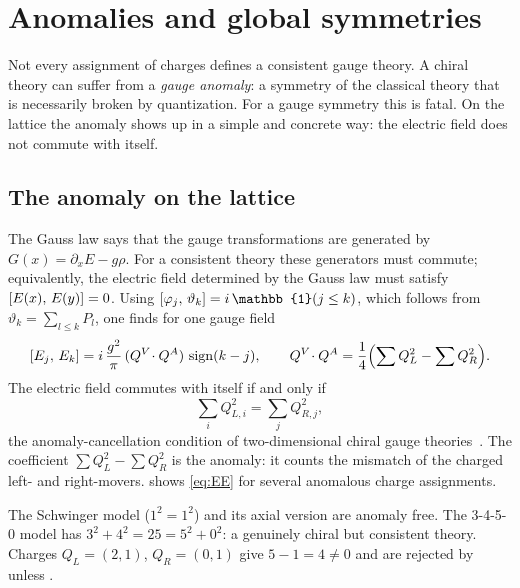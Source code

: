 \chapter{Anomalies and global symmetries}\label{chap:anomalies}

Not every assignment of charges defines a consistent gauge theory. A chiral theory can suffer from a
\emph{gauge anomaly}: a symmetry of the classical theory that is necessarily broken by quantization. For a gauge
symmetry this is fatal. On the lattice the anomaly shows up in a simple and concrete way: the electric field
does not commute with itself.

\section{The anomaly on the lattice}
The Gauss law says that the gauge transformations are generated by $G(x) = \partial_xE - g\rho$. For a consistent
theory these generators must commute; equivalently, the electric field determined by the Gauss law must satisfy
$[E(x),\,E(y)] = 0$. Using $\comm{\varphi_j}{\vartheta_k} = i\,\mathbb{1}(j\leq k)$, which follows from
$\vartheta_k = \sum_{l\leq k}P_l$, one finds for one gauge field
\begin{equation}\label{eq:EE}
  [E_j,\,E_k] = i\,\frac{g^2}{\pi}\,(Q^V\!\cdot Q^A)\,\operatorname{sign}(k-j),\qquad
  Q^V\!\cdot Q^A = \frac14\Bigl(\sum Q_L^2 - \sum Q_R^2\Bigr).
\end{equation}
The electric field commutes with itself if and only if
\begin{equation}\label{eq:anomaly-free}
  \sum_i Q_{L,i}^2 = \sum_j Q_{R,j}^2 ,
\end{equation}
the anomaly-cancellation condition of two-dimensional chiral gauge theories~\cite{Bertlmann1996}. The coefficient
$\sum Q_L^2 - \sum Q_R^2$ is the anomaly: it counts the mismatch of the charged left- and right-movers.
 shows \eqref{eq:EE} for several anomalous charge assignments.


\begin{example}
The Schwinger model ($1^2 = 1^2$) and its axial version are anomaly free. The 3-4-5-0 model has
$3^2 + 4^2 = 25 = 5^2 + 0^2$: a genuinely chiral but consistent theory. Charges $Q_L = (2,1)$, $Q_R = (0,1)$
give $5 - 1 = 4 \neq 0$ and are rejected by  unless .
\end{example}

